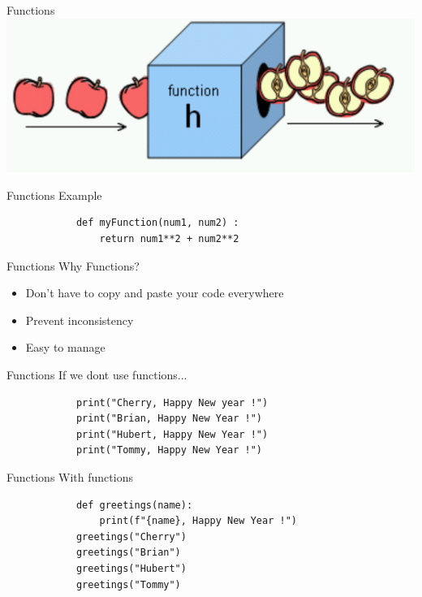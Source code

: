 \documentclass{beamer}
\begin{document}
    \begin{frame}{Functions}
        \includegraphics[scale = 0.7]{Functions.png}
    \end{frame}
    
    \begin{frame}[fragile]{Functions}
        \color{blue} \Large Example \\
        \color{black} \normalsize \vskip 5pt
        \begin{verbatim}
            def myFunction(num1, num2) :
                return num1**2 + num2**2
        \end{verbatim}
    \end{frame}
    
    \begin{frame}{Functions}
        \color{blue} \Large Why Functions? \\
        \color{black} \normalsize \vskip 5pt
        \begin{itemize}
            \item Don't have to copy and paste your code everywhere
            \item Prevent inconsistency
            \item Easy to manage
        \end{itemize}
    \end{frame}

    \begin{frame}[fragile]{Functions}
        \color{blue} \Large If we dont use functions... \\
        \color{black} \normalsize \vskip 5pt
        \begin{verbatim}
            print("Cherry, Happy New year !")
            print("Brian, Happy New Year !")
            print("Hubert, Happy New Year !")
            print("Tommy, Happy New Year !")
        \end{verbatim}
    \end{frame}

    \begin{frame}[fragile]{Functions}
        \color{blue} \Large With functions\\
        \color{black} \normalsize \vskip 5pt
        \begin{verbatim}
            def greetings(name):
                print(f"{name}, Happy New Year !")
            greetings("Cherry")
            greetings("Brian")
            greetings("Hubert")
            greetings("Tommy")
        \end{verbatim}
    \end{frame}
\end{document}
